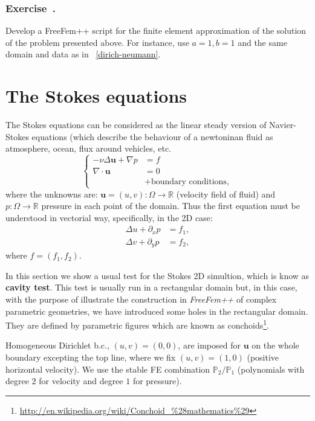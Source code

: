 \documentclass[12pt]{article}
\newcommand{\FF}{\textit{FreeFem++}\xspace}
\renewcommand{\P}{\mathbb{P}_}
\newcommand{\R}{{\mathbb R}}
\newcounter{exercise}
\newenvironment{exercise}{%
  \stepcounter{exercise}
  \subsubsection*{Exercise~\theexercise.}}
{}
\begin{document}
\begin{exercise}
  Develop a FreeFem++ script for the finite element approximation of
  the solution of the problem presented above. For instance, use
  $a=1, b=1$ and the same domain and data as in
  \lstlistingname~\ref{dirich-neumann}.
\end{exercise}

\section{The Stokes equations}
\label{sec:stokes}

The Stokes equations can be considered as the linear steady version of
Navier-Stokes equations (which describe the behaviour of a newtoninan
fluid as atmosphere, ocean, flux around vehicles, etc.
\begin{equation*}
  \left\{
  \begin{aligned}
    -\nu\Delta \mathbf{u}+ \nabla p &= f
    \\
    \nabla\cdot \mathbf{u} & = 0
    \\ & + \text{boundary conditions},
  \end{aligned}
  \right.
\end{equation*}
where the unknowns are: $\mathbf{u}=(u,v):\Omega\to\R$ (velocity field
of fluid) and $p:\Omega\to\R$ pressure in each point of the domain.
Thus the first equation must be understood in vectorial way,
specifically, in the 2D case:
\begin{align*}
  \Delta u + \partial_x p &= f_1, \\
  \Delta v + \partial_y p &= f_2,
\end{align*}
where  $f=(f_1,f_2)$.

In this section we show a usual test for the Stokes 2D simultion,
which is know as \textbf{cavity test}. This test is usually run in a
rectangular domain but, in this case, with the purpose of illustrate
the construction in \FF of complex parametric geometries, we have
introduced some holes in the rectangular domain. They are defined by
parametric figures which are known as
conchoids\footnote{\url{http://en.wikipedia.org/wiki/Conchoid_\%28mathematics\%29}}.

Homogeneous Dirichlet b.c., $(u,v)=(0,0)$, are imposed for
$\mathbf{u}$ on the whole boundary excepting the top line, where we
fix $(u,v)=(1,0)$  (positive horizontal velocity). We use the stable
FE combination  $\P2/\P1$ (polynomials with degree $2$ for velocity
and degree $1$ for pressure).
\end{document}
